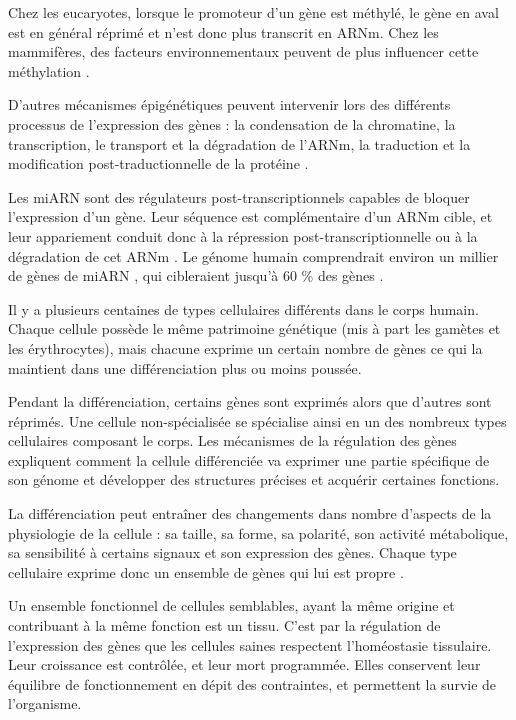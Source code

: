 			Chez les eucaryotes, lorsque le promoteur d'un gène est méthylé, le gène en aval est en général réprimé et n'est donc plus transcrit en \acs{ARNm}.
			Chez les mammifères, des facteurs environnementaux peuvent de plus influencer cette méthylation \citep{Szyf2011}.

			D'autres mécanismes épigénétiques peuvent intervenir lors des différents processus de l'expression des gènes : la condensation de la chromatine, la transcription, le transport et la dégradation de l'\acs{ARNm}, la traduction et la modification post-traductionnelle de la protéine \citep{Reik2007, Rosenfeld2009, Jia2012}.

			Les \ac{miARN} sont des régulateurs post-transcriptionnels capables de bloquer l'expression d'un gène.
			Leur séquence est complémentaire d'un \acs{ARNm} cible, et leur appariement conduit donc à la répression post-transcriptionnelle ou à la dégradation de cet \acs{ARNm} \citep{Kusenda2006, Bartel2009}.
			Le génome humain comprendrait environ un millier de gènes de \ac{miARN} \citep{Bentwich2005}, qui cibleraient jusqu'à 60 \% des gènes \citep{Lewis2005, Friedman2009}.

			Il y a plusieurs centaines de types cellulaires différents dans le corps humain.
			Chaque cellule possède le même patrimoine génétique (mis à part les gamètes et les érythrocytes), mais chacune exprime un certain nombre de gènes ce qui la maintient dans une différenciation plus ou moins poussée.

			Pendant la différenciation, certains gènes sont exprimés alors que d'autres sont réprimés.
			Une cellule non-spécialisée se spécialise ainsi en un des nombreux types cellulaires composant le corps.
			Les mécanismes de la régulation des gènes expliquent comment la cellule différenciée va exprimer une partie spécifique de son génome et développer des structures précises et acquérir certaines fonctions.

			La différenciation peut entraîner des changements dans nombre d'aspects de la physiologie de la cellule : sa taille, sa forme, sa polarité, son activité métabolique, sa sensibilité à certains signaux et son expression des gènes.
			Chaque type cellulaire exprime donc un ensemble de gènes qui lui est propre \citep{Goring2012, Wirth2011, Li2012c}.

			Un ensemble fonctionnel de cellules semblables, ayant la même origine et contribuant à la même fonction est un tissu.
			C'est par la régulation de l'expression des gènes que les cellules saines respectent l'homéostasie tissulaire.
			Leur croissance est contrôlée, et leur mort programmée.
			Elles conservent leur équilibre de fonctionnement en dépit des contraintes, et permettent la survie de l'organisme.

